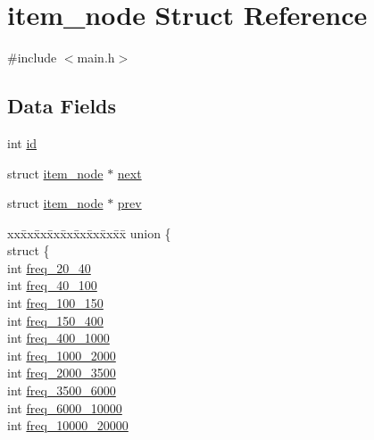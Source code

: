 \hypertarget{structitem__node}{}\section{item\+\_\+node Struct Reference}
\label{structitem__node}


{\ttfamily \#include $<$main.\+h$>$}

\subsection*{Data Fields}
\begin{DoxyCompactItemize}
\item 
int \hyperlink{structitem__node_aae126fd0abd1c21f8fb0567b417151d3}{id}
\item 
struct \hyperlink{structitem__node}{item\+\_\+node} $\ast$ \hyperlink{structitem__node_a2a6860b76bc81310d19f79695a80f58c}{next}
\item 
struct \hyperlink{structitem__node}{item\+\_\+node} $\ast$ \hyperlink{structitem__node_a9502aa572d7f0b75060d190dc3de3f1d}{prev}
\item 
\begin{tabbing}
xx\=xx\=xx\=xx\=xx\=xx\=xx\=xx\=xx\=\kill
union \{\\
\>struct \{\\
\>\>int \hyperlink{structitem__node_af94b4e364ef09b2a6bb469d358eba33c}{freq\_20\_40}\\
\>\>int \hyperlink{structitem__node_a21e69941ca758218a78f6bd7af318f0c}{freq\_40\_100}\\
\>\>int \hyperlink{structitem__node_a04fc682b9864ecc1a0522e29cbfc2b87}{freq\_100\_150}\\
\>\>int \hyperlink{structitem__node_a4a95d7254d2a2b5d51bec332ab738041}{freq\_150\_400}\\
\>\>int \hyperlink{structitem__node_a16634016f76610b8b9b30553592696bb}{freq\_400\_1000}\\
\>\>int \hyperlink{structitem__node_abc481350fe60145526ba4e1e85fba2f3}{freq\_1000\_2000}\\
\>\>int \hyperlink{structitem__node_a69d3f63035defd223d4455ee67ea6faa}{freq\_2000\_3500}\\
\>\>int \hyperlink{structitem__node_af344404af4152de0bedd8f2ec4668c0c}{freq\_3500\_6000}\\
\>\>int \hyperlink{structitem__node_abe0616c9e4331957b74d6cccddac699a}{freq\_6000\_10000}\\
\>\>int \hyperlink{structitem__node_a062eec93997e4711cee90769d50318a4}{freq\_10000\_20000}\\

\end{tabbing}
\end{DoxyCompactItemize}
